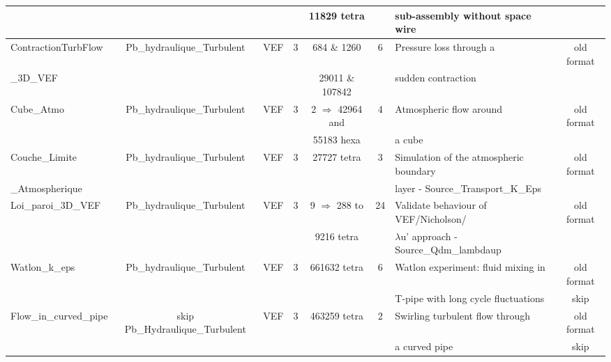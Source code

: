 \begin{table}[H]
\begin{centering}
\begin{tabular}{lclccclc}
\rowcolor{SkyBlue!10} & & & & 11829 tetra & & sub-assembly without space wire & \\
\hline
\rowcolor{SkyBlue!10}ContractionTurbFlow & Pb\_hydraulique\_Turbulent & VEF & 3 & 684 \& 1260 & 6 & Pressure loss through a  & old format \\ 
\rowcolor{SkyBlue!10}\_3D\_VEF & & & & 29011 \& 107842 & & sudden contraction & \\
\hline
\rowcolor{SkyBlue!10}Cube\_Atmo & Pb\_hydraulique\_Turbulent & VEF & 3 & 2 $\Rightarrow$ 42964 and & 4 & Atmospheric flow around & old format \\ 
\rowcolor{SkyBlue!10} & & & & 55183 hexa & & a cube &  \\
\hline
\rowcolor{SkyBlue!10}Couche\_Limite & Pb\_hydraulique\_Turbulent & VEF & 3 & 27727 tetra & 3 & Simulation of the atmospheric boundary & old format \\ 
\rowcolor{SkyBlue!10}\_Atmospherique & & & & & & layer - Source\_Transport\_K\_Eps & \\
\hline
\rowcolor{SkyBlue!10}Loi\_paroi\_3D\_VEF & Pb\_hydraulique\_Turbulent & VEF & 3 & 9 $\Rightarrow$ 288 to & 24 & Validate behaviour of VEF/Nicholson/ & old format \\ 
\rowcolor{SkyBlue!10} & & & & 9216 tetra & & $\lambda$u' approach - Source\_Qdm\_lambdaup & \\
\hline
\rowcolor{SkyBlue!10}Watlon\_k\_eps & Pb\_hydraulique\_Turbulent & VEF & 3 & 661632 tetra & 6 & Watlon experiment: fluid mixing in & old format \\ 
\rowcolor{SkyBlue!10} & & & & & & T-pipe with long cycle fluctuations & skip \\
\hline
\rowcolor{SkyBlue!10}Flow\_in\_curved\_pipe & skip Pb\_Hydraulique\_Turbulent & VEF & 3 & 463259 tetra & 2 & Swirling turbulent flow through & old format \\ 
\rowcolor{SkyBlue!10} & & & & & & a curved pipe & skip \\ \hline
\end{tabular}
\end{centering}
\end{table}

\newpage

